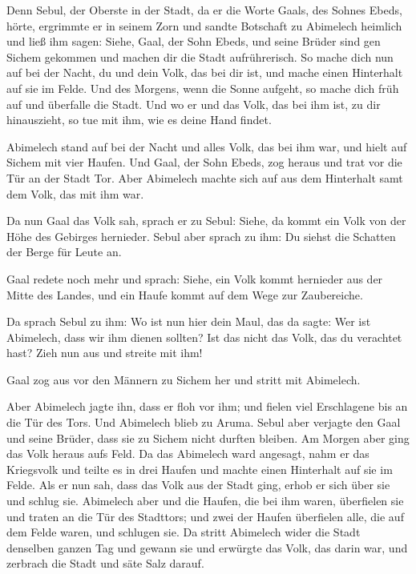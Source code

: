  Denn Sebul, der Oberste in der Stadt, da er die Worte
Gaals, des Sohnes Ebeds, hörte, ergrimmte er in seinem Zorn
 und sandte Botschaft zu Abimelech heimlich und ließ ihm
sagen: Siehe, Gaal, der Sohn Ebeds, und seine Brüder sind gen Sichem
gekommen und machen dir die Stadt aufrührerisch.  So mache
dich nun auf bei der Nacht, du und dein Volk, das bei dir ist, und mache
einen Hinterhalt auf sie im Felde.  Und des Morgens, wenn
die Sonne aufgeht, so mache dich früh auf und überfalle die Stadt. Und
wo er und das Volk, das bei ihm ist, zu dir hinauszieht, so tue mit ihm,
wie es deine Hand findet.

 Abimelech stand auf bei der Nacht und alles Volk, das bei
ihm war, und hielt auf Sichem mit vier Haufen.  Und Gaal,
der Sohn Ebeds, zog heraus und trat vor die Tür an der Stadt Tor. Aber
Abimelech machte sich auf aus dem Hinterhalt samt dem Volk, das mit ihm
war.

 Da nun Gaal das Volk sah, sprach er zu Sebul: Siehe, da
kommt ein Volk von der Höhe des Gebirges hernieder. Sebul aber sprach zu
ihm: Du siehst die Schatten der Berge für Leute an.

 Gaal redete noch mehr und sprach: Siehe, ein Volk kommt
hernieder aus der Mitte des Landes, und ein Haufe kommt auf dem Wege zur
Zaubereiche.

 Da sprach Sebul zu ihm: Wo ist nun hier dein Maul, das da
sagte: Wer ist Abimelech, dass wir ihm dienen sollten? Ist das nicht das
Volk, das du verachtet hast? Zieh nun aus und streite mit ihm!

 Gaal zog aus vor den Männern zu Sichem her und stritt mit
Abimelech.

 Aber Abimelech jagte ihn, dass er floh vor ihm; und fielen
viel Erschlagene bis an die Tür des Tors.  Und Abimelech
blieb zu Aruma. Sebul aber verjagte den Gaal und seine Brüder, dass sie
zu Sichem nicht durften bleiben.  Am Morgen aber ging das
Volk heraus aufs Feld. Da das Abimelech ward angesagt, 
nahm er das Kriegsvolk und teilte es in drei Haufen und machte einen
Hinterhalt auf sie im Felde. Als er nun sah, dass das Volk aus der Stadt
ging, erhob er sich über sie und schlug sie.  Abimelech
aber und die Haufen, die bei ihm waren, überfielen sie und traten an die
Tür des Stadttors; und zwei der Haufen überfielen alle, die auf dem
Felde waren, und schlugen sie.  Da stritt Abimelech wider
die Stadt denselben ganzen Tag und gewann sie und erwürgte das Volk, das
darin war, und zerbrach die Stadt und säte Salz darauf.

